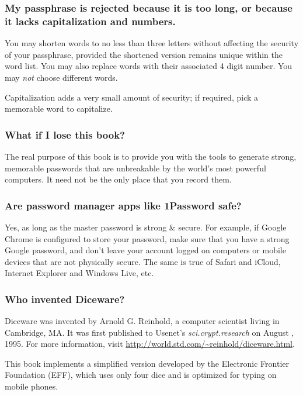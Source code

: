 \subsubsection{My passphrase is rejected because it is too long, or because it lacks capitalization and numbers.}

You may shorten words to no less than three letters without affecting the security of your passphrase, provided the shortened version remains unique within the word list. You may also replace words with their associated 4 digit number. You may \textit{not} choose different words.

Capitalization adds a very small amount of security; if required, pick a memorable word to capitalize.

\subsubsection{What if I lose this book?}

The real purpose of this book is to provide you with the tools to generate strong, memorable passwords that are unbreakable by the world's most powerful computers. It need not be the only place that you record them.

\subsubsection{Are password manager apps like 1Password safe?}

Yes, as long as the master password is strong \& secure. For example, if Google Chrome is configured to store your password, make sure that you have a strong Google password, and don't leave your account logged on computers or mobile devices that are not physically secure. The same is true of Safari and iCloud, Internet Explorer and Windows Live, etc.

\subsubsection{Who invented Diceware?}

Diceware was invented by Arnold G. Reinhold, a computer scientist living in Cambridge, MA. It was first published to Usenet's \textit{sci.crypt.research} on August , 1995. For more information, visit \url{http://world.std.com/~reinhold/diceware.html}. 

This book implements a simplified version developed by the Electronic Frontier Foundation (EFF), which uses only four dice and is optimized for typing on mobile phones.
 
